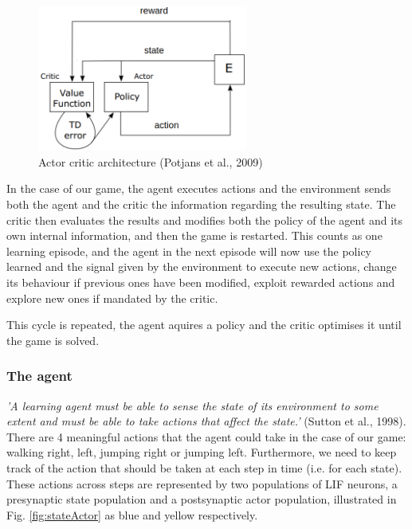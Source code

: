 \documentclass[10pt]{article}
\begin{document}
    \begin{figure}[ht!]
    \centering
    \includegraphics[width=69mm]{./actorCriticDiagram.png}
    \caption{Actor critic architecture (Potjans et al., 2009)}
    \label{fig:potjansArchitecture}
    \end{figure}

    \setcounter{figure}{5}

    In the case of our game, the agent executes actions and the environment sends both the agent and the critic the information regarding the resulting state. The critic then evaluates the results and modifies both the policy of the agent and its own internal information, and then the game is restarted. This counts as one learning episode, and the agent in the next episode will now use the policy learned and the signal given by the environment to execute new actions, change its behaviour if previous ones have been modified, exploit rewarded actions and explore new ones if mandated by the critic. 
    
    This cycle is repeated, the agent aquires a policy and the critic optimises it until the game is solved.

    \subsubsection{The agent}

    \textit{'A learning agent must be able to sense the state of its environment to some extent and must be able to take actions that affect the state.'} (Sutton et al., 1998). There are 4 meaningful actions that the agent could take in the case of our game: walking right, left, jumping right or jumping left. Furthermore, we need to keep track of the action that should be taken at each step in time (i.e. for each state). These actions across steps are represented by two populations of LIF neurons, a presynaptic state population and a postsynaptic actor population, illustrated in Fig. \ref{fig:stateActor} as blue and yellow respectively.
    
\end{document}
